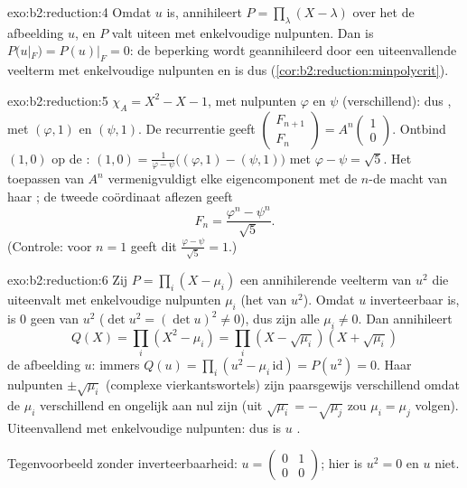 \begin{solution}{exo:b2:reduction:4}
Omdat $u$  is, annihileert $P = \prod_{\lambda}(X
- \lambda)$ over het  de afbeelding $u$, en $P$ valt uiteen
met enkelvoudige nulpunten. Dan is $P(u|_F) = P(u)|_F = 0$: de
beperking wordt geannihileerd door een uiteenvallende veelterm met
enkelvoudige nulpunten en is dus 
(\cref{cor:b2:reduction:minpolycrit}).
\end{solution}

\begin{solution}{exo:b2:reduction:5}
$\chi_A = X^2 - X - 1$, met nulpunten $\varphi$ en $\psi$
(verschillend): dus , met  $(\varphi,
1)$ en $(\psi, 1)$. De recurrentie geeft $\begin{pmatrix} F_{n+1}\\
F_n \end{pmatrix} = A^n \begin{pmatrix}1\\ 0\end{pmatrix}$. Ontbind
$(1, 0)$ op de : $(1,0) = \frac{1}{\varphi -
\psi}\bigl((\varphi, 1) - (\psi, 1)\bigr)$ met $\varphi - \psi =
\sqrt5$. Het toepassen van $A^n$ vermenigvuldigt elke
eigencomponent met de $n$-de macht van haar ; de tweede
coördinaat aflezen geeft
\[
F_n = \frac{\varphi^n - \psi^n}{\sqrt 5} .
\]
(Controle: voor $n = 1$ geeft dit $\frac{\varphi -
\psi}{\sqrt5} = 1$.)
\end{solution}

\begin{solution}{exo:b2:reduction:6}
Zij $P = \prod_i (X - \mu_i)$ een annihilerende veelterm van $u^2$
die uiteenvalt met enkelvoudige nulpunten $\mu_i$ (het  van
$u^2$). Omdat $u$ inverteerbaar is, is $0$ geen  van
$u^2$ ($\det u^2 = (\det u)^2 \neq 0$), dus zijn alle $\mu_i \neq
0$. Dan annihileert
\[
Q(X) = \prod_i (X^2 - \mu_i) = \prod_i (X - \sqrt{\mu_i})(X +
\sqrt{\mu_i})
\]
de afbeelding $u$: immers $Q(u) = \prod_i (u^2 -
\mu_i\,\mathrm{id}) = P(u^2) = 0$. Haar nulpunten $\pm
\sqrt{\mu_i}$ (complexe vierkantswortels) zijn paarsgewijs
verschillend omdat de $\mu_i$ verschillend en ongelijk aan nul zijn
(uit $\sqrt{\mu_i} = -\sqrt{\mu_j}$ zou $\mu_i = \mu_j$ volgen).
Uiteenvallend met enkelvoudige nulpunten: dus is $u$
.

Tegenvoorbeeld zonder inverteerbaarheid: $u = \begin{pmatrix} 0 &
1\\ 0 & 0\end{pmatrix}$; hier is $u^2 = 0$  en $u$
niet.
\end{solution}

